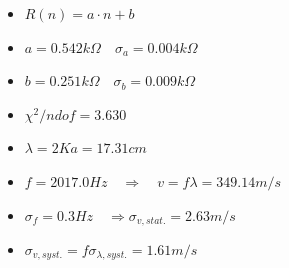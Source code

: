 \documentclass[14pt]{beamer}
\begin{document}
\begin{frame}
\begin{itemize}
\item $R(n)=a \cdot n+b$
\item $a=0.542k\Omega \quad \sigma_{a}=0.004k\Omega$
\item $b=0.251k\Omega \quad \sigma_b=0.009k\Omega$
\item $\chi^2/ndof=3.630$
\item $\lambda=2Ka=17.31cm$
\item $f=2017.0Hz \quad \Rightarrow \quad v=f \lambda = 349.14m/s$
\item $\sigma_f=0.3Hz \quad \Rightarrow \sigma_{v,stat.}=2.63m/s$
\item $\sigma_{v,syst.}=f \sigma_{\lambda,syst.}=1.61m/s$
\end{itemize}
\end{frame}
\end{document}
